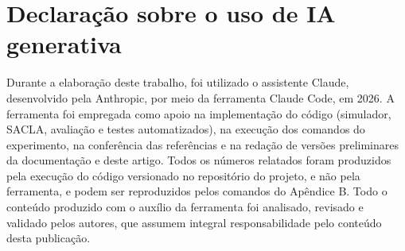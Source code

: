 %

\section*{Declaração sobre o uso de IA generativa}
\label{sec:declaracao-uso-ia}

Durante a elaboração deste trabalho, foi utilizado o assistente Claude, desenvolvido pela
Anthropic, por meio da ferramenta Claude Code, em 2026. A ferramenta foi empregada como apoio na
implementação do código (simulador, SACLA, avaliação e testes automatizados), na execução dos
comandos do experimento, na conferência das referências e na redação de versões preliminares da
documentação e deste artigo. Todos os números relatados foram produzidos pela execução do código
versionado no repositório do projeto, e não pela ferramenta, e podem ser reproduzidos pelos
comandos do Apêndice B. Todo o conteúdo produzido com o auxílio da ferramenta foi analisado,
revisado e validado pelos autores, que assumem integral responsabilidade pelo conteúdo desta
publicação.
